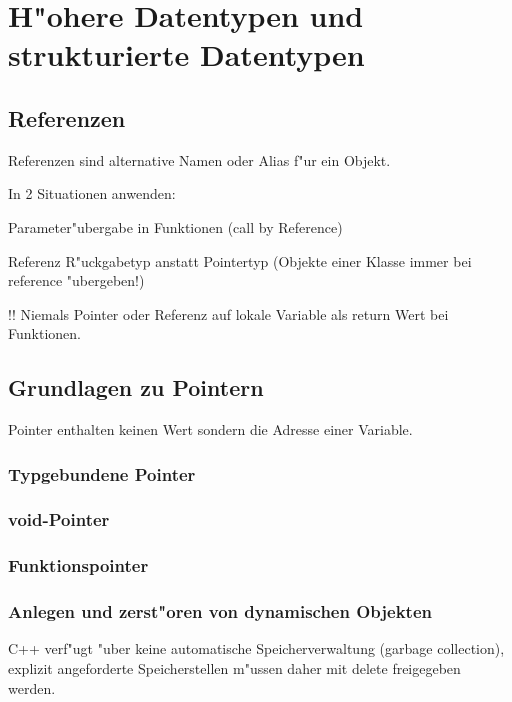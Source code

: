 \section{H"ohere Datentypen und strukturierte Datentypen}
  \subsection{Referenzen}
  Referenzen sind alternative Namen oder Alias f"ur ein Objekt.
  	
  	
  	In 2 Situationen anwenden: 
  				\begin{compactitem}
  					\item Parameter"ubergabe in Funktionen (call by Reference)
  					\item Referenz R"uckgabetyp anstatt Pointertyp (Objekte einer Klasse immer bei reference "ubergeben!)
  				\end{compactitem}
  				!! Niemals Pointer oder Referenz auf lokale Variable als return Wert bei Funktionen. 
  \subsection{Grundlagen zu Pointern}
  Pointer enthalten keinen Wert sondern die Adresse einer Variable.\\
 
    	 	\subsubsection{Typgebundene Pointer}
    	
 
    	 	\subsubsection{void-Pointer}
       
       		\subsubsection{Funktionspointer}
       
       \subsubsection{Anlegen und zerst"oren von dynamischen Objekten}
       
       C++ verf"ugt "uber keine automatische Speicherverwaltung (garbage collection), explizit angeforderte Speicherstellen m"ussen daher mit delete freigegeben werden.
